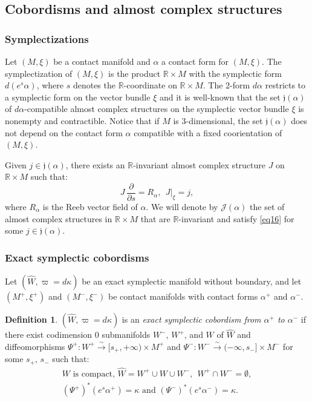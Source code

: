 \documentclass[10pt]{amsart}
\let\mathcal\mathscr
\newcommand{\isom}{\stackrel\sim\longrightarrow}
\theoremstyle{plain}
\theoremstyle{definition}
\newtheorem{defn}[thm]{Definition}
\numberwithin{equation}{subsection}
\newcommand{\bdry}{\partial}
\let\Subsection\subsection\let\Subsubsection\subsubsection
\begin{document}
\Subsection{Cobordisms and almost complex structures}

\subsubsection{Symplectizations}

Let $(M,\xi)$ be a contact manifold and $\alpha$ a contact form for $(M,\xi)$. The symplectization of $(M,\xi)$ is the product $\mathbb{R} \times M$ with the symplectic form $d(e^s \alpha)$, where $s$ denotes the $\mathbb{R}$-coordinate on $\mathbb{R} \times M$. The $2$-form $d\alpha$ restricts to a symplectic form on the vector bundle $\xi$ and it is well-known that the set $\mathfrak{j}(\alpha)$ of $d\alpha$\nobreakdash-compatible almost complex structures on the symplectic vector bundle $\xi$ is nonempty and contractible. Notice that if $M$ is $3$-dimensional, the set $\mathfrak{j}(\alpha)$ does not depend on the contact form $\alpha$ compatible with a fixed coorientation of $(M,\xi)$.

Given $j \in \mathfrak{j}(\alpha)$, there exists an $\mathbb{R}$-invariant almost complex structure $J$ on $\mathbb{R} \times M$ such that:
\begin{equation} \label{eq16}
J\, \frac{\bdry}{\bdry s} = R_\alpha, \ \ J|_\xi = j,
\end{equation}
where $R_\alpha$ is the Reeb vector field of $\alpha$.
We will denote by $\mathcal{J}(\alpha)$ the set of almost complex structures in $\mathbb{R} \times M$ that are $\mathbb{R}$-invariant
and satisfy \eqref{eq16} for some $j \in \mathfrak{j}(\alpha)$.

\subsubsection{Exact symplectic cobordisms}

Let $(\widehat{W} ,\varpi = d\kappa)$ be an exact symplectic manifold without boundary, and let $(M^+,\xi^+)$ and $(M^-,\xi^-)$ be contact manifolds with contact forms $\alpha^+$ and $\alpha^-$.

\begin{defn}
$(\widehat{W} ,\varpi = d\kappa)$ is an {\em exact symplectic cobordism from $\alpha^+$ to $\alpha^-$} if there exist codimension $0$ submanifolds $W^-$, $W^+$, and $W$ of $\widehat{W}$ and diffeomorphisms $\Psi^+: W^+ \isom [s_+,+\infty) \times M^+$ and $\Psi^-: W^- \isom (-\infty,s_-] \times M^-$ for some $s_+$, $s_-$ such that:
\begin{equation}
\begin{gathered}
W \mbox{ is compact, } \widehat{W}= W^+ \cup W \cup W^-, ~~ W^+ \cap W^- = \emptyset,\\
(\Psi^+)^* (e^s\alpha^+) = \kappa \mbox{ and } (\Psi^-)^* (e^s\alpha^-) = \kappa.
\end{gathered}
\end{equation}
\end{defn}
\end{document}
